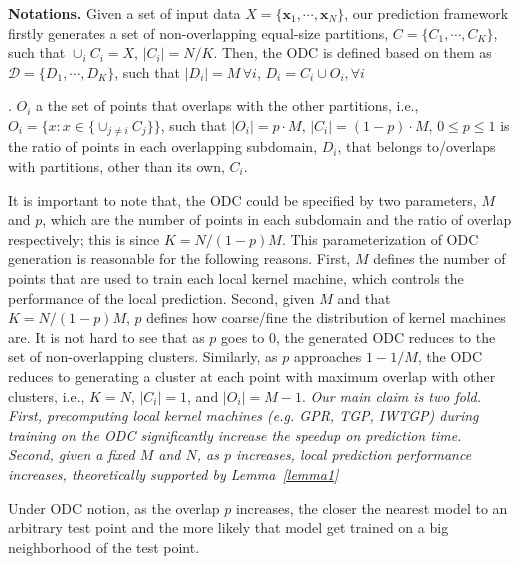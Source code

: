 \noindent\textbf{Notations.} Given a set of input data  $X=\{\mathbf{x}_1, \cdots, \mathbf{x}_N  \}$, our prediction framework firstly  generates a set of non-overlapping equal-size partitions,  $C=\{C_1, \cdots, C_K\}$, such that $\cup_{i}{C}_i = X$, $| C_i| = N/K$. Then, the ODC is defined based on them as $\mathcal{D} =  \{ {D}_1, \cdots, {D}_K \}$, such that $|{D}_i| =M\, \forall i$, ${D}_i = C_i \cup O_i, \forall i$. $O_i$ a the set of points that overlaps with the other partitions, i.e.,  $O_i  = \{x: x \in  \{\cup_{j \neq i} {C}_j\} \}$,  such that $|O_i| = p \cdot M$, $|C_i| = (1-p) \cdot M$,   $0 \le p \le 1$ is the ratio of points in each overlapping subdomain, $D_i$, that belongs to/overlaps with partitions, other than its own, $C_i$. 

It is important to note that, the ODC could be specified by two parameters, $M$  and $p$, which are the number of points in each subdomain and the ratio of overlap respectively; this is since $K= N/ (1-p) M$.  This parameterization of ODC generation is reasonable for the following reasons. First, $M$ defines the number of points that are used to train each local kernel machine, which controls the performance of the local prediction. Second, given $M$ and that $K= N/ (1-p) M$, $p$  defines how coarse/fine the distribution of kernel machines are.  It is not hard to see that as $p$ goes to $0$, the generated ODC reduces to the set of non-overlapping clusters. Similarly, as $p$ approaches $1 - 1/M$, the ODC reduces to generating a cluster at each point with maximum overlap with other clusters, i.e., $K=N$, $|C_i|=1$, and $|O_i| = M -1$. 
\textit{Our main claim is two fold. First, precomputing local kernel machines (e.g.  GPR, TGP, IWTGP) during training on the ODC significantly increase the speedup on prediction time. Second, given a fixed $M$ and $N$, as $p$ increases, local prediction performance increases, theoretically supported by Lemma~\ref{lemma1}} 
\vspace{-0.5mm}
\begin{lem}
Under ODC notion, as the overlap $p$ increases, the  closer the nearest model to an arbitrary test point and the more likely that model get trained on a big neighborhood of the test point.  
\label{lemma1}
\end{lem}

